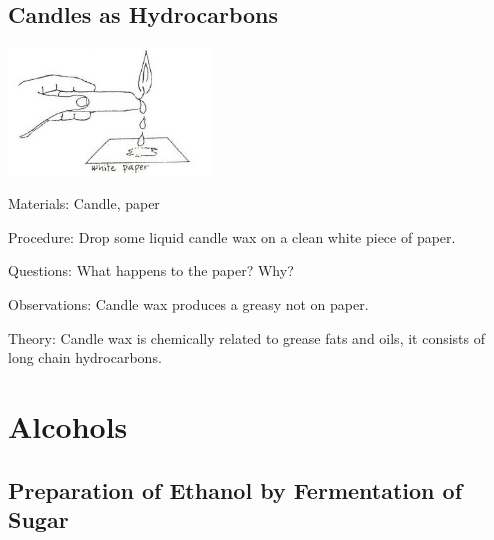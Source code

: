 \begin{multicols}{2}
\vfill
\columnbreak

\subsection{Candles as Hydrocarbons}

\begin{center}
\includegraphics[width=0.4\textwidth]{./img/source/candle-hydrocarbon.jpg}
\end{center}

\begin{description*}
\item[Materials:]{Candle, paper}
\item[Procedure:]{Drop some liquid candle wax on a clean
white piece of paper.}
\item[Questions:]{What happens to the paper? Why?}
\item[Observations:]{Candle wax produces a greasy not on paper.}
\item[Theory:]{Candle wax is chemically related to grease
fats and oils, it consists of long chain
hydrocarbons.}
\end{description*}


\section*{Alcohols}  


\subsection{Preparation of Ethanol by Fermentation of Sugar} 



\end{multicols}
